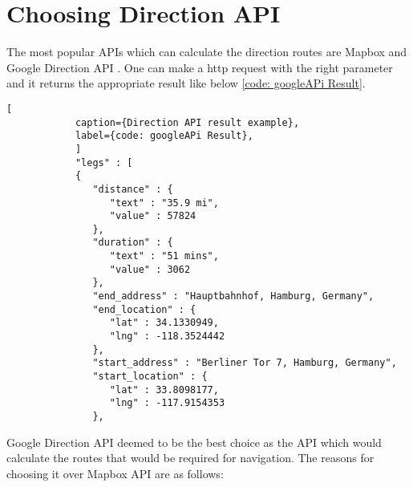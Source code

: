 \section{Choosing Direction API}  
        The most popular APIs which can calculate the direction routes are Mapbox \cite{mapbox} 
        and Google Direction API \cite{googleDirecAPI}. One can make a http request with the 
        right parameter and it returns the appropriate result like below \ref{code: googleAPi Result}.
        \begin{lstlisting}[
            caption={Direction API result example}, 
            label={code: googleAPi Result},
            ]
            "legs" : [
            {
               "distance" : {
                  "text" : "35.9 mi",
                  "value" : 57824
               },
               "duration" : {
                  "text" : "51 mins",
                  "value" : 3062
               },
               "end_address" : "Hauptbahnhof, Hamburg, Germany",
               "end_location" : {
                  "lat" : 34.1330949,
                  "lng" : -118.3524442
               },
               "start_address" : "Berliner Tor 7, Hamburg, Germany",
               "start_location" : {
                  "lat" : 33.8098177,
                  "lng" : -117.9154353
               },  
        \end{lstlisting}
    
        Google Direction API deemed to be the best choice as the API which
        would calculate the routes that would be required for navigation.
        The reasons for choosing it over Mapbox API are as follows:

